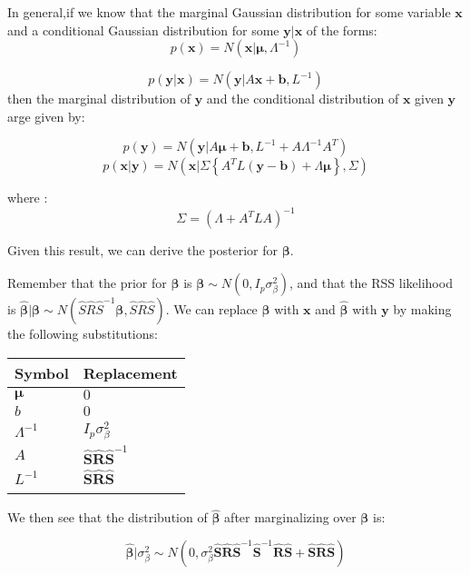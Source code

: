 {In general,if we know that the marginal Gaussian distribution for some variable \(\textbf{x}\) and a conditional Gaussian distribution for some \(\textbf{y}|\textbf{x}\) of the forms:
$$p(\textbf{x}) = N(\textbf{x}|\boldsymbol{\mu},\Lambda^{-1})$$

$$p(\textbf{y}|\textbf{x}) = N(\textbf{y}|A\textbf{x}+\textbf{b},L^{-1})$$
then the marginal distribution of \(\textbf{y}\) and the conditional distribution of \(\textbf{x}\) given \(\textbf{y}\) arge given by: 

$$ p(\textbf{y}) = N(\textbf{y}|A\boldsymbol{\mu}+\textbf{b},L^{-1}+A\Lambda^{-1}A^{T})$$
$$p(\textbf{x}|\textbf{y}) = N(\textbf{x}| \Sigma \left\{ A^{T} L ( \textbf{y} - \textbf{b} ) + \Lambda \boldsymbol{\mu} \right\} , \Sigma)$$

where :
$$\Sigma = (\Lambda + A^{T}LA)^{-1}$$

Given this result, we can derive the posterior for \(\boldsymbol{\beta}\).

Remember that the prior for \(\boldsymbol{\beta}\) is \(\boldsymbol{\beta} \sim N(0,I_p\sigma^2_\beta)\), and that the RSS likelihood is \(\hat{\boldsymbol{\beta}} | \boldsymbol{\beta} \sim N(\hat{S}\hat{R}\hat{S}^{-1}\boldsymbol{\beta},\hat{S}\hat{R}\hat{S})\).  
We can replace \(\boldsymbol{\beta}\) with \(\textbf{x}\) and \(\hat{\boldsymbol{\beta}}\) with \(\textbf{y}\) by making the following substitutions:

\begin{center}
\begin{tabular}{ll}
Symbol & Replacement\\
\hline
\(\boldsymbol{\mu}\) & \(0\)\\
\(b\) & \(0\)\\
\(\Lambda^{-1}\) & \(I_p \sigma^2_\beta\)\\
\(A\) & \(\hat{\textbf{S}}\hat{\textbf{R}}\hat{\textbf{S}}^{-1}\)\\
\(L^{-1}\) & \(\hat{\textbf{S}}\hat{\textbf{R}}\hat{\textbf{S}}\)\\
 & \\
\end{tabular}
\end{center}

We then see that the distribution of \(\hat{\boldsymbol{\beta}}\) after marginalizing over $\boldsymbol{\beta}$ is:

$$ \hat{\boldsymbol{\beta}}|\sigma_\beta^2 \sim N(0,\sigma_\beta^2\hat{\textbf{S}}\hat{\textbf{R}}\hat{\textbf{S}}^{-1}\hat{\textbf{S}}^{-1}\hat{\textbf{R}}\hat{\textbf{S}}+\hat{\textbf{S}}\hat{\textbf{R}}\hat{\textbf{S}})$$ 

}
